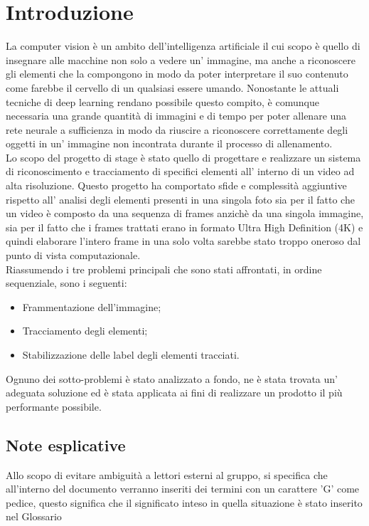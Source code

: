 \section{Introduzione}
La computer vision è un ambito dell'intelligenza artificiale il cui scopo è quello di insegnare alle macchine non solo a vedere un' immagine, ma anche a riconoscere gli elementi che la compongono in modo da poter interpretare il suo contenuto come farebbe il cervello di un qualsiasi essere umando. Nonostante le attuali tecniche di deep learning rendano possibile questo compito, è comunque necessaria una grande quantità di immagini e di tempo per poter allenare una rete neurale a sufficienza in modo da riuscire a riconoscere correttamente degli oggetti in un' immagine non incontrata durante il processo di allenamento.\\

Lo scopo del progetto di stage è stato quello di progettare e realizzare un sistema di riconoscimento e tracciamento di specifici elementi all' interno di un video ad alta risoluzione. Questo progetto ha comportato sfide e complessità aggiuntive rispetto all' analisi degli elementi presenti in una singola foto sia per il fatto che un video è composto da una sequenza di frames anzichè da una singola immagine, sia per il fatto che i frames trattati erano in formato Ultra High Definition (4K) e quindi elaborare l'intero frame in una solo volta sarebbe stato troppo oneroso dal punto di vista computazionale.\\

Riassumendo i tre problemi principali che sono stati affrontati, in ordine sequenziale, sono i seguenti:
\begin{itemize}
\item Frammentazione dell'immagine;
\item Tracciamento degli elementi;
\item Stabilizzazione delle label degli elementi tracciati.
\end{itemize}
Ognuno dei sotto-problemi è stato analizzato a fondo, ne è stata trovata un' adeguata soluzione ed è stata applicata ai fini di realizzare un prodotto il più performante possibile.

\subsection{Note esplicative}
Allo scopo di evitare ambiguità a lettori esterni al gruppo, si specifica che all'interno del documento verranno inseriti dei termini con un carattere 'G' come pedice, questo significa che il significato inteso in quella situazione è stato inserito nel Glossario
